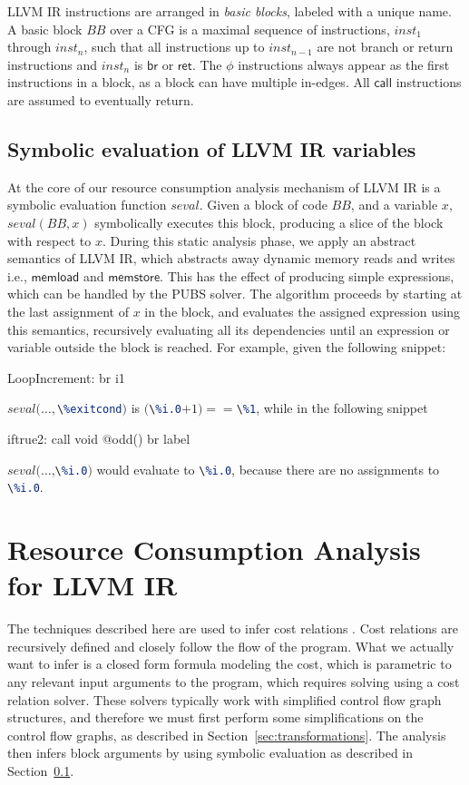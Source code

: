 \documentclass[9pt,preprint]{sigplanconf}
\newcommand{\mathspace}[1]{\ensuremath{#1}\xspace}
\newcommand{\instit}[1]{\mathspace{\mathsf{#1}}}
\newcommand{\aBlock}{\mathspace{\mathit{BB}}}
\newcommand{\aVar}{\mathspace{x}}
\newcommand{\inst}{\mathspace{\mathit{inst}}}
\newcommand{\seval}{\mathspace{\mathit{seval}}}
\newcommand{\memload}{\instit{memload}}
\newcommand{\memstore}{\instit{memstore}}
\newcommand{\call}{\instit{call}}
\newcommand{\ret}{\instit{ret}}
\newcommand{\br}{\instit{br}}
\newcommand{\seclabel}[1]{\label{sec:#1}}
\newcommand{\secref}[1]{Section~\ref{sec:#1}}
\newcommand\llvminline[1]{\lstinline[language=LLVM]{#1}}
\begin{document}
LLVM IR instructions are arranged in \emph{basic blocks}, labeled with
a unique name. A basic block \aBlock over a CFG is a maximal sequence of
instructions, $\inst_1$ through $\inst_n$, such that all instructions
up to $\inst_{n-1}$ are not branch or return instructions and $\inst_n$ is \br
or \ret. The $\phi$ instructions always appear as the first instructions in a
block, as a block can have multiple in-edges. All \call instructions are assumed
to eventually return.

\subsection{Symbolic evaluation of LLVM IR variables}\seclabel{seval}
At the core of our resource consumption analysis mechanism of LLVM IR is a symbolic
evaluation function \seval. Given a block of code \aBlock, and a variable \aVar,
$\seval(\aBlock,\aVar)$ symbolically executes this block, producing a slice
\cite{slicing} of the block with respect to \aVar. During this
static analysis phase, we apply an abstract semantics of LLVM IR, which
abstracts away dynamic memory reads and writes i.e., \memload and
\memstore. This has the effect of producing simple expressions, which can be
handled by the PUBS solver. The algorithm proceeds by starting at the last
assignment of \aVar in the block, and evaluates the assigned expression using
this semantics, recursively evaluating all its dependencies until an expression
or variable outside the block is reached. For example, given the following snippet:

\begin{llvmcode}
  LoopIncrement:
br i1 \end{llvmcode}
$\seval(\ldots,$\llvminline{\%exitcond}$)$ is $($\llvminline{\%i.0}$ + 1) ==
$\llvminline{\%1}, while in the following snippet

\begin{llvmcode}
  iftrue2:
    call void @odd()
    br label \end{llvmcode}
$\seval(\ldots$,\llvminline{\%i.0}$)$ would evaluate to \llvminline{\%i.0},
because there are no assignments to \llvminline{\%i.0}.


\section{Resource Consumption Analysis for LLVM IR}\seclabel{resourceanalysis}
The techniques described here are used to infer cost relations
\cite{AlbertAGP11a}. Cost relations are recursively defined and closely follow the flow of the
program. What we actually want to infer is a closed form formula modeling the
cost, which is parametric to any relevant input arguments to the program, which
requires solving using a cost relation solver. These solvers typically work with
simplified control flow graph structures, and therefore we must first perform some
simplifications on the control flow graphs, as described in
\secref{transformations}. The analysis then infers block arguments by using
symbolic evaluation as described in \secref{seval}.
\end{document}
